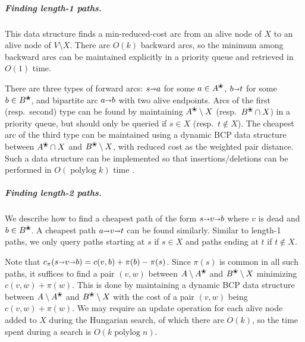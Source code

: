 \documentclass[a4paper,UKenglish,nolineno]{socg-lipics-v2019}
\def\polylog{\mathop{\mathrm{polylog}}}
\def\arcto{\mathord\shortrightarrow}
\def\arc#1#2{#1\arcto#2}
\def\alive#1{{#1}^\text{\ding{96}}}
\def\dead#1{{#1} \setminus \alive{#1}}
\begin{document}
\subparagraph{Finding length-1 paths.}
This data structure finds a min-reduced-cost arc from an alive node of
$X$ to an alive node of $V \setminus X$.
There are $O(k)$ backward arcs, so the minimum among backward arcs can be
maintained explicitly in a priority queue and retrieved in $O(1)$ time.

There are three types of forward arcs: $\arc sa$ for some $a \in \alive{A}$,
$\arc bt$ for some $b \in \alive{B}$, and bipartite arc $\arc ab$ with two
alive endpoints.
Arcs of the first (resp.\ second) type can be found by maintaining
$\alive{A} \setminus X$ (resp.\ $\alive{B} \cap X$) in a priority queue,
but should only be queried if $s \in X$ (resp.\ $t \not\in X$).
%
The cheapest arc of the third type can be maintained using a dynamic
BCP data structure between $\alive{A} \cap X$ and $\alive{B} \setminus X$,
with reduced cost as the weighted pair distance.
Such a data structure can be implemented so that insertions/deletions can be
performed in $O(\polylog k)$ time \cite{KMRSS17}.

\subparagraph{Finding length-2 paths.}
We describe how to find a cheapest path of the form $s \arcto v \arcto b$ where
$v$ is dead and $b \in \alive{B}$.
A cheapest path $a \arcto v \arcto t$ can be found similarly.
Similar to length-1 paths, we only query paths starting at $s$ if $s \in X$
and paths ending at $t$ if $t \not\in X$.

Note that $c_\pi(s \arcto v \arcto b) = c(v, b) + \pi(b) - \pi(s)$.
Since $\pi(s)$ is common in all such paths, it suffices to find a pair $(v,w)$ between
$\dead{A}$ and $\alive{B} \setminus X$ minimizing $c(v, w) + \pi(w)$.
This is done by maintaining a dynamic BCP data structure between
$\dead{A}$ and $\alive{B} \setminus X$ with
the cost of a pair $(v, w)$ being $c(v, w) + \pi(w)$.
We may require an update operation for each alive node added to $X$ during the
Hungarian search, of which there are $O(k)$, so the time spent during a search
is $O(k\polylog n)$.
\end{document}
